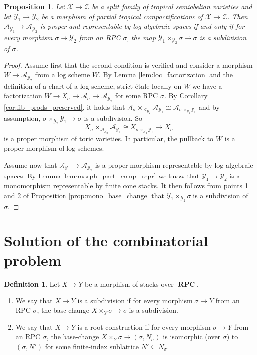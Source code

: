 \documentclass[11pt]{amsart}
\newtheorem{proposition}[theorem]{Proposition}
\theoremstyle{definition}
\newtheorem{definition}[theorem]{Definition}
\theoremstyle{remark}
\DeclareMathOperator{\RPC}{\mathbf{RPC}}
\begin{document}
\begin{proposition}
	\label{prop:bir_iff_subdiv}
	Let $\mathcal{X}\to \mathcal{Z}$ be a split family of tropical semiabelian varieties and
	let $\mathcal{Y}_1\to \mathcal{Y}_2$ be a morphism of partial tropical compactifications of $\mathcal{X}\to \mathcal{Z}$.
	Then $\mathcal{A}_{\mathcal{Y}_1}\to \mathcal{A}_{\mathcal{Y}_2}$ is proper and representable by log algebraic spaces
	if and only if for every morphism $\sigma\to \mathcal{Y}_2$ from an RPC $\sigma$, the map
	$\mathcal{Y}_1\times_{\mathcal{Y}_2}\sigma\to \sigma$ is a subdivision of $\sigma$.
\end{proposition}

\begin{proof}
	Assume first that the second condition is verified and consider a morphism $W\to \mathcal{A}_{\mathcal{Y}_2}$ from
	a log scheme $W$. By Lemma \ref{lem:loc_factorization} and the definition of a chart of a log scheme, strict étale locally on $W$ we have a factorization $W\to X_{\sigma}\to \mathcal{A}_{\sigma}\to \mathcal{A}_{\mathcal{Y}_2}$
	for some RPC $\sigma$. By Corollary \ref{cor:fib_prods_preserved},
	it holds that $\mathcal{A}_{\sigma}\times_{\mathcal{A}_{\mathcal{Y}_2}}\mathcal{A}_{\mathcal{Y}_1}\cong \mathcal{A}_{\sigma\times_{\mathcal{Y}_2}\mathcal{Y}_1}$ and
	by assumption, $\sigma\times_{\mathcal{Y}_2}\mathcal{Y}_1\to \sigma$ is a subdivision. So
	$$X_{\sigma}\times_{\mathcal{A}_{\mathcal{Y}_2}}\mathcal{A}_{\mathcal{Y}_1}\cong X_{\sigma\times_{\mathcal{Y}_2}\mathcal{Y}_1}\to X_{\sigma}$$
	is a proper morphism of toric varieties. In particular, the pullback to $W$ is a proper morphism of log schemes.

	Assume now that $\mathcal{A}_{\mathcal{Y}_1}\to \mathcal{A}_{\mathcal{Y}_2}$ is a proper morphism representable
	by log algebraic spaces. By Lemma \ref{lem:morph_part_comp_repr} we know that $\mathcal{Y}_1\to \mathcal{Y}_2$
	is a monomorphism representable by finite cone stacks. It then follows from points 1 and 2
	of Proposition \ref{prop:mono_base_change} that $\mathcal{Y}_1\times_{\mathcal{Y}_2}\sigma$ is a subdivision of $\sigma$.
\end{proof}

\section{Solution of the combinatorial problem}
\label{sec:combinat_problem}

\begin{definition}
	Let $X\to Y$ be a morphism of stacks over $\RPC$.
	\begin{enumerate}
		\item We say that $X\to Y$ is a subdivision if
			for every morphism $\sigma\to Y$ from an RPC $\sigma$, the base-change $X\times_{Y}\sigma\to \sigma$ is
			a subdivision.
		\item We say that $X\to Y$ is a root construction if for every morphism $\sigma\to Y$ from an RPC $\sigma$,
			the base-change $X\times_Y\sigma\to(\sigma,N_{\sigma})$ is isomorphic (over $\sigma$) to $(\sigma,N')$ for some finite-index
			sublattice $N'\subseteq N_{\sigma}$.
	\end{enumerate}
\end{definition}
\end{document}
